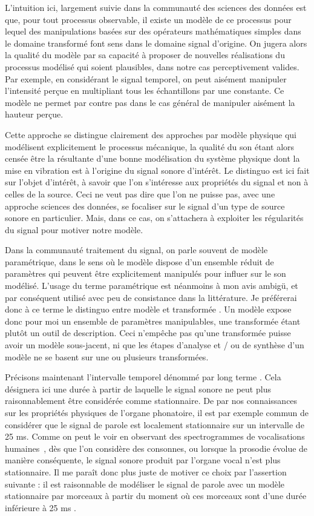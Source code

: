 L'intuition ici, largement suivie dans la communauté des sciences des données est que, pour tout processus observable, il existe un modèle de ce processus pour lequel des manipulations basées sur des opérateurs mathématiques simples dans le domaine transformé \og font sens \fg dans le domaine \og signal \fg d'origine. On jugera alors la qualité du modèle par sa capacité à proposer de nouvelles réalisations du processus modélisé qui soient plausibles, dans notre cas perceptivement valides. Par exemple, en considérant le signal temporel, on peut aisément manipuler l'intensité perçue en multipliant tous les échantillons par une constante. Ce modèle ne permet par contre pas dans le cas général de manipuler aisément la hauteur perçue.

Cette approche se distingue clairement des approches par \og modèle physique \fg qui modélisent explicitement le processus mécanique, la qualité du son étant alors censée être la résultante d'une bonne modélisation du système physique dont la mise en vibration est à l'origine du signal sonore d'intérêt. Le distinguo est ici fait sur l'objet d'intérêt, à savoir que l'on s'intéresse aux propriétés du signal et non à celles de la source. Ceci ne veut pas dire que l'on ne puisse pas, avec une approche sciences des données, se focaliser sur le signal d'un type de source sonore en particulier. Mais, dans ce cas, on s'attachera à exploiter les régularités du signal pour motiver notre modèle.

Dans la communauté traitement du signal, on parle souvent de modèle paramétrique, dans le sens où le modèle dispose d'un ensemble réduit de paramètres qui peuvent être explicitement manipulés pour influer sur le son modélisé. L'usage du terme \og paramétrique \fg est néanmoins à mon avis ambigü, et par conséquent utilisé avec peu de consistance dans la littérature. Je préférerai donc à ce terme le distinguo entre \og modèle \fg et \og transformée \fg. Un modèle expose donc pour moi un ensemble de paramètres manipulables, une transformée étant plutôt un outil de description. Ceci n'empêche pas qu'une transformée puisse avoir un modèle sous-jacent, ni que les étapes d'analyse et / ou de synthèse d'un modèle ne se basent sur une ou plusieurs transformées.

Précisons maintenant l'intervalle temporel dénommé par \og long terme \fg. Cela désignera ici une durée à partir de laquelle le signal sonore ne peut plus raisonnablement être considérée comme stationnaire. De par nos connaissances sur les propriétés physiques de l'organe phonatoire, il est par exemple commun de considérer que le signal de parole est localement stationnaire sur un intervalle de 25 ms. Comme on peut le voir en observant des spectrogrammes de vocalisations humaines~\cite{ladefoged2014course}, dès que l'on considère des consonnes, ou lorsque la prosodie évolue de manière conséquente, le signal sonore produit par l'organe vocal n'est plus stationnaire. Il me paraît donc plus juste de motiver ce choix par l'assertion suivante : \og il est raisonnable de modéliser le signal de parole avec un modèle stationnaire par morceaux à partir du moment où ces morceaux sont d'une durée inférieure à 25 ms \fg.

